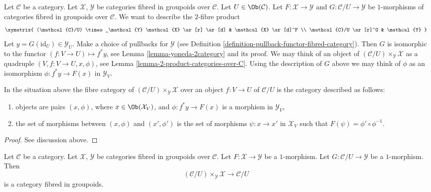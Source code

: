 \noindent
Let $\mathcal{C}$ be a category.
Let $\mathcal{X}$, $\mathcal{Y}$ be categories fibred in groupoids
over $\mathcal{C}$.
Let $U \in \Ob(\mathcal{C})$.
Let $F : \mathcal{X} \to \mathcal{Y}$ and
$G : \mathcal{C}/U \to \mathcal{Y}$ be $1$-morphisms of categories
fibred in groupoids over $\mathcal{C}$.
We want to describe
the $2$-fibre product
$$
\xymatrix{
(\mathcal{C}/U) \times_\mathcal{Y} \mathcal{X} \ar[r] \ar[d] &
\mathcal{X} \ar[d]^F \\
\mathcal{C}/U \ar[r]^G &
\mathcal{Y}
}
$$
Let $y = G(\text{id}_U) \in \mathcal{Y}_U$.
Make a choice of pullbacks for $\mathcal{Y}$
(see Definition \ref{definition-pullback-functor-fibred-category}).
Then $G$ is isomorphic to the functor $(f : V \to U) \mapsto f^*y$,
see Lemma \ref{lemma-yoneda-2category} and its proof.
We may think of an object of
$(\mathcal{C}/U) \times_\mathcal{Y} \mathcal{X}$
as a quadruple $(V, f : V \to U, x, \phi)$, see
Lemma \ref{lemma-2-product-categories-over-C}.
Using the description of $G$ above we may think of $\phi$ as
an isomorphism $\phi : f^*y \to F(x)$ in $\mathcal{Y}_V$.

\begin{lemma}
\label{lemma-identify-fibre-product}
In the situation above the fibre category of
$(\mathcal{C}/U) \times_\mathcal{Y} \mathcal{X}$ over
an object $f : V \to U$ of $\mathcal{C}/U$
is the category described as follows:
\begin{enumerate}
\item objects are pairs $(x, \phi)$,
where $x \in \Ob(\mathcal{X}_V)$, and
$\phi : f^*y \to F(x)$ is a morphism in $\mathcal{Y}_V$,
\item the set of morphisms between $(x, \phi)$ and $(x', \phi')$
is the set of morphisms $\psi : x \to x'$ in $\mathcal{X}_V$
such that $F(\psi) = \phi' \circ \phi^{-1}$.
\end{enumerate}
\end{lemma}

\begin{proof}
See discussion above.
\end{proof}

\begin{lemma}
\label{lemma-prepare-representable-map-stack-in-groupoids}
Let $\mathcal{C}$ be a category.
Let $\mathcal{X}$, $\mathcal{Y}$ be categories fibred in groupoids
over $\mathcal{C}$.
Let $F : \mathcal{X} \to \mathcal{Y}$ be a $1$-morphism.
Let $G : \mathcal{C}/U \to \mathcal{Y}$ be a $1$-morphism.
Then
$$
(\mathcal{C}/U) \times_\mathcal{Y} \mathcal{X}
\longrightarrow
\mathcal{C}/U
$$
is a category fibred in groupoids.
\end{lemma}

